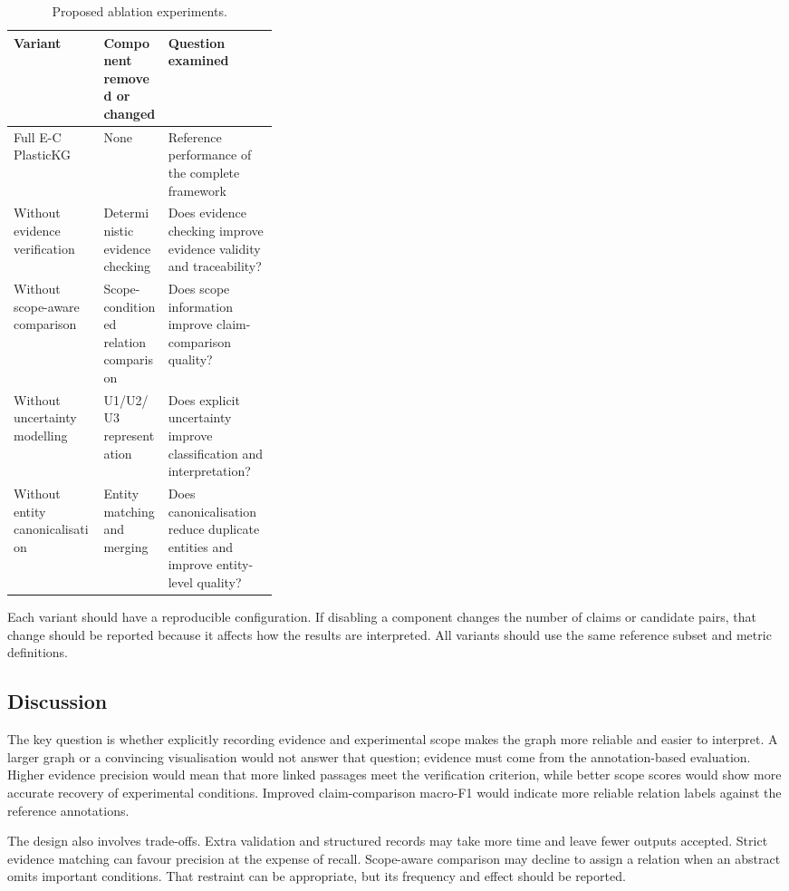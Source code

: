 \documentclass[11pt,a4paper]{article}
\begin{document}
\begin{table}[htbp]
\centering
\caption{Proposed ablation experiments.}
\label{tab:ablation}
\begin{tabularx}{\linewidth}{>{\raggedright\arraybackslash}p{0.34\linewidth}XX}
\toprule
\textbf{Variant} & \textbf{Component removed or changed} & \textbf{Question examined}\\
\midrule
Full E-C PlasticKG & None & Reference performance of the complete framework\\
Without evidence verification & Deterministic evidence checking & Does evidence checking improve evidence validity and traceability?\\
Without scope-aware comparison & Scope-conditioned relation comparison & Does scope information improve claim-comparison quality?\\
Without uncertainty modelling & U1/U2/U3 representation & Does explicit uncertainty improve classification and interpretation?\\
Without entity canonicalisation & Entity matching and merging & Does canonicalisation reduce duplicate entities and improve entity-level quality?\\
\bottomrule
\end{tabularx}
\end{table}

Each variant should have a reproducible configuration. If disabling a component changes the number of claims or candidate pairs, that change should be reported because it affects how the results are interpreted. All variants should use the same reference subset and metric definitions.

\subsection{Discussion}

The key question is whether explicitly recording evidence and experimental scope makes the graph more reliable and easier to interpret. A larger graph or a convincing visualisation would not answer that question; evidence must come from the annotation-based evaluation. Higher evidence precision would mean that more linked passages meet the verification criterion, while better scope scores would show more accurate recovery of experimental conditions. Improved claim-comparison macro-F1 would indicate more reliable relation labels against the reference annotations.

The design also involves trade-offs. Extra validation and structured records may take more time and leave fewer outputs accepted. Strict evidence matching can favour precision at the expense of recall. Scope-aware comparison may decline to assign a relation when an abstract omits important conditions. That restraint can be appropriate, but its frequency and effect should be reported.
\end{document}
